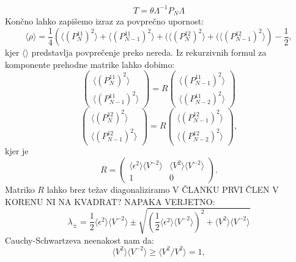 \begin{appendices}
\begin{equation}
T =  \theta \Lambda^{-1} P_N \Lambda
\end{equation} 
Končno lahko zapišemo izraz za povprečno upornost:
\begin{equation}
\langle \rho \rangle = \frac{1}{4} \left( \langle (P_N^{11})^2 \rangle + \langle (P_{N-1}^{11})^2 \rangle +  ( \langle (P_N^{12})^2 \rangle + ( \langle (P_{N-1}^{12})^2 \rangle \right) - \frac{1}{2},
\end{equation}
kjer $\langle \rangle$ predstavlja povprečenje preko nereda.
Iz rekurzivnih formul za komponente prehodne matrike lahko dobimo:
\begin{equation}
\begin{pmatrix}  \langle (P_N^{11})^2 \rangle \\ \langle (P_{N-1}^{11})^2 \rangle \end{pmatrix} = R \begin{pmatrix}  \langle (P_{N-1}^{11})^2 \rangle \\  \langle (P_{N-2}^{11})^2 \rangle \end{pmatrix}
\end{equation}
\begin{equation}
\begin{pmatrix} \langle (P_N^{12})^2 \rangle \\ \langle (P_{N-1}^{12})^2 \rangle \end{pmatrix} = R \begin{pmatrix}  \langle (P_{N-1}^{12})^2 \rangle \\  \langle (P_{N-2}^{12})^2 \rangle \end{pmatrix},
\end{equation}
kjer je
\begin{equation}
R = \begin{pmatrix} \langle \epsilon^2 \rangle \langle V^{-2} \rangle & \langle V^2 \rangle \langle V^{-2} \rangle \\ 1 & 0 \end{pmatrix}.
\end{equation}
Matriko $R$ lahko brez težav diagonaliziramo V ČLANKU PRVI ČLEN V KORENU NI NA KVADRAT? NAPAKA VERJETNO:
\begin{equation}
\lambda_\pm = \frac{1}{2} \langle \epsilon^2 \rangle \langle V^{-2} \rangle \pm \sqrt{(\frac{1}{2} \langle \epsilon^2 \rangle \langle V^{-2} \rangle)^2 + \langle V^2 \rangle \langle V^{-2} \rangle}
\end{equation}
Cauchy-Schwartzeva  neenakost nam da:
\begin{equation}
\langle V^2 \rangle \langle V^{-2} \rangle \geq \langle V^2 / V^2 \rangle = 1,

\end{equation}
\end{appendices}
